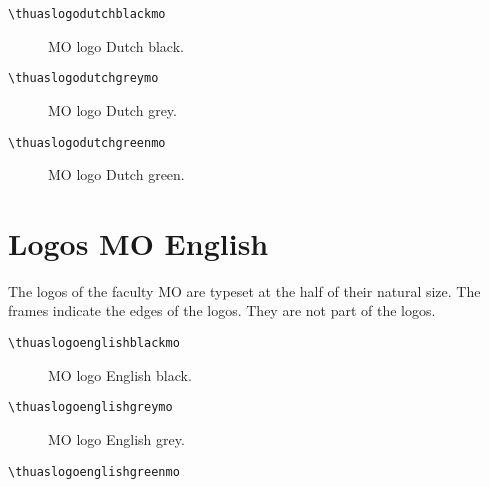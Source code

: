\documentclass[a4paper,12pt]{article}
\begin{document}
\begin{verbatim}
\thuaslogodutchblackmo
\end{verbatim}

\begin{figure}[H]
\centering\fboxsep=0pt%
\fbox{%
\scalebox{0.7071}{\thuaslogodutchblackmo}}
\caption{MO logo Dutch black.}
\end{figure}

\begin{verbatim}
\thuaslogodutchgreymo
\end{verbatim}

\begin{figure}[H]
\centering\fboxsep=0pt%
\fbox{%
\scalebox{0.7071}{\thuaslogodutchgreymo}}
\caption{MO logo Dutch grey.}
\end{figure}

\begin{verbatim}
\thuaslogodutchgreenmo
\end{verbatim}

\begin{figure}[H]
\centering\fboxsep=0pt%
\fbox{%
\scalebox{0.7071}{\thuaslogodutchgreenmo}}
\caption{MO logo Dutch green.}
\end{figure}


\section{Logos MO English}
The logos of the faculty MO are typeset at the half of their natural size.
The frames indicate the edges of the logos. They are not part of the logos.

\begin{verbatim}
\thuaslogoenglishblackmo
\end{verbatim}

\begin{figure}[H]
\centering\fboxsep=0pt%
\fbox{%
\scalebox{0.7071}{\thuaslogoenglishblackmo}}
\caption{MO logo English black.}
\end{figure}

\begin{verbatim}
\thuaslogoenglishgreymo
\end{verbatim}

\begin{figure}[H]
\centering\fboxsep=0pt%
\fbox{%
\scalebox{0.7071}{\thuaslogoenglishgreymo}}
\caption{MO logo English grey.}
\end{figure}

\begin{verbatim}
\thuaslogoenglishgreenmo
\end{verbatim}
\end{document}
